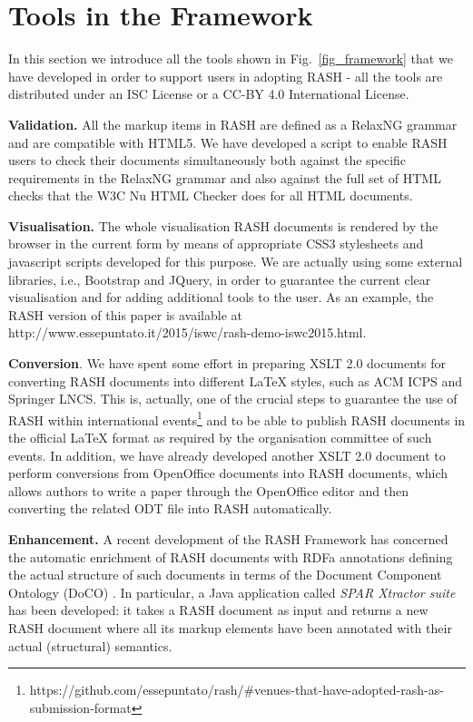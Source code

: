 \documentclass[runningheads,a4paper]{llncs}
\begin{document}
\section{Tools in the Framework}\label{sec_tools}

In this section we introduce all the tools shown in Fig.~\ref{fig_framework} that we have developed in order to support users in adopting RASH - all the tools are distributed under an ISC License or a CC-BY 4.0 International License.

{\bf Validation.} All the markup items in RASH are defined as a RelaxNG grammar and are compatible with HTML5. We have developed a script to enable RASH users to check their documents simultaneously both against the specific requirements in the RelaxNG grammar and also against the full set of HTML checks that the W3C Nu HTML Checker does for all HTML documents.

{\bf Visualisation.} The whole visualisation RASH documents is rendered by the browser in the current form by means of appropriate CSS3 stylesheets and javascript scripts developed for this purpose. We are actually using some external libraries, i.e., Bootstrap and JQuery, in order to guarantee the current clear visualisation and for adding additional tools to the user. As an example, the RASH version of this paper is available at http://www.essepuntato.it/2015/iswc/rash-demo-iswc2015.html.

{\bf Conversion}. We have spent some effort in preparing XSLT 2.0 documents for converting RASH documents into different LaTeX styles, such as ACM ICPS and Springer LNCS. This is, actually, one of the crucial steps to guarantee the use of RASH within international events\footnote{https://github.com/essepuntato/rash/\#venues-that-have-adopted-rash-as-submission-format} and to be able to publish RASH documents in the official LaTeX format as required by the organisation committee of such events. In addition, we have already developed another XSLT 2.0 document to perform conversions from OpenOffice documents into RASH documents, which allows authors to write a paper through the OpenOffice editor and then converting the related ODT file into RASH automatically.

{\bf Enhancement.} A recent development of the RASH Framework has concerned the automatic enrichment of RASH documents with RDFa annotations defining the actual structure of such documents in terms of the Document Component Ontology (DoCO) \cite{doco}. In particular, a Java application called {\em SPAR Xtractor suite} has been developed: it takes a RASH document as input and returns a new RASH document where all its markup elements have been annotated with their actual (structural) semantics.
\end{document}
